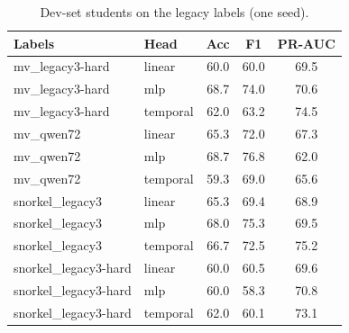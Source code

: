\begin{table}[t]
\centering
\caption{Dev-set students on the legacy labels (one seed).}
\label{tab:early_legacy}
\small
\begin{tabular}{llccc}
\toprule
Labels & Head & Acc & F1 & PR-AUC \\
\midrule
mv\_legacy3-hard & linear & 60.0 & 60.0 & 69.5 \\
mv\_legacy3-hard & mlp & 68.7 & 74.0 & 70.6 \\
mv\_legacy3-hard & temporal & 62.0 & 63.2 & 74.5 \\
mv\_qwen72 & linear & 65.3 & 72.0 & 67.3 \\
mv\_qwen72 & mlp & 68.7 & 76.8 & 62.0 \\
mv\_qwen72 & temporal & 59.3 & 69.0 & 65.6 \\
snorkel\_legacy3 & linear & 65.3 & 69.4 & 68.9 \\
snorkel\_legacy3 & mlp & 68.0 & 75.3 & 69.5 \\
snorkel\_legacy3 & temporal & 66.7 & 72.5 & 75.2 \\
snorkel\_legacy3-hard & linear & 60.0 & 60.5 & 69.6 \\
snorkel\_legacy3-hard & mlp & 60.0 & 58.3 & 70.8 \\
snorkel\_legacy3-hard & temporal & 62.0 & 60.1 & 73.1 \\
\bottomrule
\end{tabular}
\end{table}